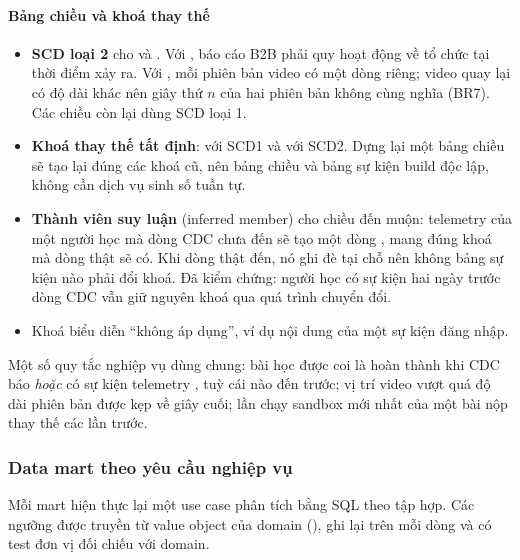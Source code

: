 \paragraph{Bảng chiều và khoá thay thế}

\begin{itemize}
  \item \textbf{SCD loại 2} cho  và . Với , báo cáo B2B phải quy hoạt động về tổ chức tại thời điểm xảy ra. Với , mỗi phiên bản video có một dòng riêng; video quay lại có độ dài khác nên giây thứ $n$ của hai phiên bản không cùng nghĩa (BR7). Các chiều còn lại dùng SCD loại 1.
  \item \textbf{Khoá thay thế tất định}:  với SCD1 và  với SCD2. Dựng lại một bảng chiều sẽ tạo lại đúng các khoá cũ, nên bảng chiều và bảng sự kiện build độc lập, không cần dịch vụ sinh số tuần tự.
  \item \textbf{Thành viên suy luận} (inferred member) cho chiều đến muộn: telemetry của một người học mà dòng CDC chưa đến sẽ tạo một dòng , mang đúng khoá mà dòng thật sẽ có. Khi dòng thật đến, nó ghi đè tại chỗ nên không bảng sự kiện nào phải đổi khoá. Đã kiểm chứng: người học  có sự kiện hai ngày trước dòng CDC vẫn giữ nguyên khoá qua quá trình chuyển đổi.
  \item Khoá  biểu diễn ``không áp dụng'', ví dụ nội dung của một sự kiện đăng nhập.
\end{itemize}

Một số quy tắc nghiệp vụ dùng chung: bài học được coi là hoàn thành khi CDC báo  \emph{hoặc} có sự kiện telemetry , tuỳ cái nào đến trước; vị trí video vượt quá độ dài phiên bản được kẹp về giây cuối; lần chạy sandbox mới nhất của một bài nộp thay thế các lần trước.

\subsubsection{Data mart theo yêu cầu nghiệp vụ}

Mỗi mart hiện thực lại một use case phân tích bằng SQL theo tập hợp. Các ngưỡng được truyền từ value object của domain (), ghi lại trên mỗi dòng và có test đơn vị đối chiếu với domain.

